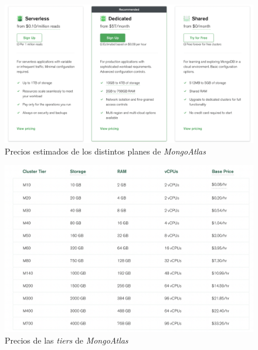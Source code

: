 \begin{figure}[H]
    \centering	
        \includegraphics[scale=0.25]{img/mongo-plans.png}
    \caption{ Precios estimados de los distintos planes de \textit{MongoAtlas} }\label{fig:mongo-plans}
\end{figure}

\begin{figure}[H]
    \centering	
        \includegraphics[scale=0.25]{img/mongo-tiers.png}
    \caption{ Precios de las \textit{tiers} de \textit{MongoAtlas} }\label{fig:mongo-tiers}
\end{figure}
